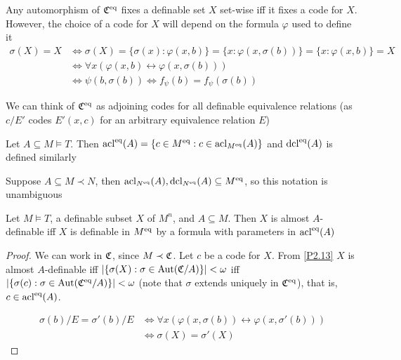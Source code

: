 \documentclass[11pt]{article}
\begin{document}
\begin{remark}
Any automorphism of \(\mathfrak{C}^{\operatorname{eq}}\) fixes a definable set \(X\) set-wise iff it fixes a code
for \(X\). However, the choice of a code for \(X\) will depend on the formula \(\varphi\) used to define
it
\begin{align*}
\sigma(X)=X&\Leftrightarrow\sigma(X)=\{\sigma(x):\varphi(x,b)\}=\{x:\varphi(x,\sigma(b))\}=\{x:\varphi(x,b)\}=X\\
&\Leftrightarrow\forall x(\varphi(x,b)\leftrightarrow\varphi(x,\sigma(b)))\\
&\Leftrightarrow\psi(b,\sigma(b))\Leftrightarrow f_\psi(b)=f_\psi(\sigma(b))
\end{align*}

We can think of \(\mathfrak{C}^{\operatorname{eq}}\) as adjoining codes for all definable equivalence relations
(as \(c/E'\) codes \(E'(x,c)\) for an arbitrary equivalence relation \(E\))
\end{remark}

\begin{definition}[]
Let \(A\subseteq M\vDash T\). Then \(\operatorname{acl}^{\operatorname{eq}}(A)=\{c\in M^{\operatorname{eq}}:c\in\operatorname{acl}_{M^{\operatorname{eq}}}(A)\}\) and \(\operatorname{dcl}^{\operatorname{eq}}(A)\)
is defined similarly
\end{definition}

\begin{remark}
Suppose \(A\subseteq M\prec N\), then \(\operatorname{acl}_{N^{\operatorname{eq}}}(A),\operatorname{dcl}_{N^{\operatorname{eq}}}(A)\subseteq M^{\operatorname{eq}}\), so this notation is unambiguous
\end{remark}

\begin{lemma}[]
\label{P2.35}
Let \(M\vDash T\), a definable subset \(X\) of \(M^n\), and \(A\subseteq M\). Then \(X\) is
almost \(A\)-definable iff \(X\) is definable in \(M^{\operatorname{eq}}\) by a formula with parameters in \(\operatorname{acl}^{\operatorname{eq}}(A)\)
\end{lemma}

\begin{proof}
We can work in \(\mathfrak{C}\), since \(M\prec\mathfrak{C}\). Let \(c\) be a code for \(X\). From \ref{P2.13} \(X\) is
almost \(A\)-definable iff \(\abs{\{\sigma(X):\sigma\in\Aut(\fC/A)\}}<\omega\) iff \(\abs{\{\sigma(c):\sigma\in\Aut(\fC^{\eq}/A)\}}<\omega\)
(note that \(\sigma\) extends uniquely in \(\mathfrak{C}^{\operatorname{eq}}\)),
that is, \(c\in\operatorname{acl}^{\operatorname{eq}}(A)\).

\begin{align*}
\sigma(b)/E=\sigma'(b)/E&\Leftrightarrow\forall x(\varphi(x,\sigma(b))\leftrightarrow\varphi(x,\sigma'(b)))\\
&\Leftrightarrow\sigma(X)=\sigma'(X)
\end{align*}
\end{proof}
\end{document}
